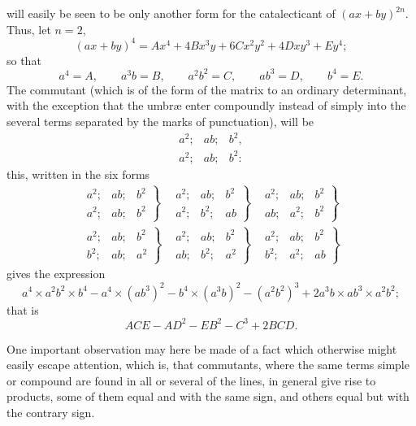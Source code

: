 \documentclass[11pt]{article}
\newcommand{\sourcepage}[1]{\marginpar{\scriptsize p.~#1}}
\begin{document}
\sourcepage{315}
will easily be seen to be only another form for the catalecticant of $(ax+by)^{2n}$. Thus, let $n=2$,
\[
(ax+by)^4=Ax^4+4Bx^3y+6Cx^2y^2+4Dxy^3+Ey^4;
\]
so that
\[
a^4=A,\qquad a^3b=B,\qquad a^2b^2=C,\qquad ab^3=D,\qquad b^4=E.
\]
The commutant (which is of the form of the matrix to an ordinary determinant, with the exception that the umbræ enter compoundly instead of simply into the several terms separated by the marks of punctuation), will be
\[
\begin{array}{ccc}
a^2;&ab;&b^2,\\
a^2;&ab;&b^2:
\end{array}
\]
this, written in the six forms
\[
\begin{array}{ccc}
\left.\begin{array}{ccc}a^2;&ab;&b^2\\a^2;&ab;&b^2\end{array}\right\}&
\left.\begin{array}{ccc}a^2;&ab;&b^2\\a^2;&b^2;&ab\end{array}\right\}&
\left.\begin{array}{ccc}a^2;&ab;&b^2\\ab;&a^2;&b^2\end{array}\right\}\\[1.0em]
\left.\begin{array}{ccc}a^2;&ab;&b^2\\b^2;&ab;&a^2\end{array}\right\}&
\left.\begin{array}{ccc}a^2;&ab;&b^2\\ab;&b^2;&a^2\end{array}\right\}&
\left.\begin{array}{ccc}a^2;&ab;&b^2\\b^2;&a^2;&ab\end{array}\right\}
\end{array}
\]
gives the expression
\[
a^4\times a^2b^2\times b^4-a^4\times(ab^3)^2-b^4\times(a^3b)^2-(a^2b^2)^3
+2a^3b\times ab^3\times a^2b^2;
\]
that is
\[
ACE-AD^2-EB^2-C^3+2BCD.
\]

One important observation may here be made of a fact which otherwise might easily escape attention, which is, that commutants, where the same terms simple or compound are found in all or several of the lines, in general give rise to products, some of them equal and with the same sign, and others equal but with the contrary sign.
\end{document}
